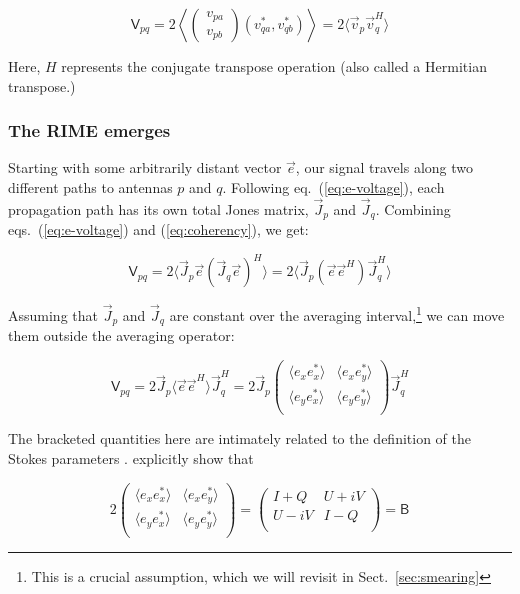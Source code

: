 \documentclass[]{aa}
\newcommand{\matrixtt}[4]{\left( \begin{array}{cc}#1&#2\\#3&#4\\\end{array} \right)}
\newcommand{\herm}{H}
\newcommand{\jones}[2]{\vec {#1}_{#2}}
\newcommand{\jonesT}[2]{\vec {#1}^{\herm}_{#2}}
\newcommand{\coh}[2]{\mathsf{{#1}}_{{#2}}}
\begin{document}
\begin{equation}\label{eq:coherency}
\coh{V}{pq} = 2 \left<\left( \begin{array}{c}v_{pa}\\v_{pb}\end{array} \right) (v^*_{qa},v^*_{qb}) \right > = 2 \langle \vec v_p \vec v^\herm_q \rangle
\end{equation}

Here, $\herm$ represents the conjugate transpose operation (also called a Hermitian transpose.)

\subsubsection{\label{sec:RIME-emerges}The RIME emerges}

Starting with some arbitrarily distant vector $\vec e$, our signal travels along two different paths to antennas $p$ and $q$. Following eq.~(\ref{eq:e-voltage}), each propagation path has its own total Jones matrix, $\jones{J}{p}$ and $\jones{J}{q}$. Combining eqs.~(\ref{eq:e-voltage}) and (\ref{eq:coherency}), we get:

    \begin{equation}\label{eq:corr1}
    \coh{V}{pq} = 2 \langle  \jones{J}{p} \vec e ( \jones{J}{q} \vec e )^\herm \rangle  = 2 \langle  \jones{J}{p} (\vec e \vec e^\herm) \jonesT{J}{q} \rangle 
    \end{equation}

Assuming that $\jones{J}{p}$ and $\jones{J}{q}$ are constant over the averaging interval,\footnote{This is a crucial assumption, which we will revisit in Sect.~\ref{sec:smearing}} we can move them outside the averaging operator:

    \begin{equation}\label{eq:corr2}
    \coh{V}{pq} = 2 \jones{J}{p} \langle  \vec e \vec e^\herm \rangle  \jonesT{J}{q} = 
    2 \jones{J}{p} 
    \matrixtt{\langle e_x e^*_x\rangle }{\langle e_x e^*_y\rangle }{\langle e_y e^*_x\rangle }{\langle e_y e^*_y\rangle }
    \jonesT{J}{q}
    \end{equation}

The bracketed quantities here are intimately related to the definition of the Stokes parameters \citep{born-wolf,tms}. \citet{ME3} explicitly show that

    \begin{equation}\label{eq:IQUV}
    2 
    \matrixtt{\langle e_x e^*_x\rangle }{\langle e_x e^*_y\rangle }{\langle e_y e^*_x\rangle }{\langle e_y e^*_y\rangle }
    = 
    \matrixtt{I+Q}{U+iV}{U-iV}{I-Q} = \coh{B}{}
    \end{equation}
\end{document}
